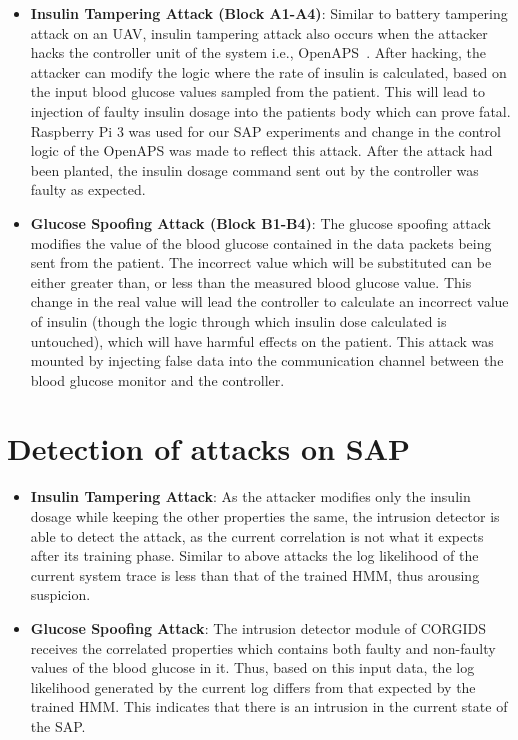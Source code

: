 \begin{itemize}
\item {\bf Insulin Tampering Attack (Block A1-A4)}: Similar to battery tampering attack on an \ac{UAV}, insulin tampering attack also occurs when the attacker hacks the controller unit of the system i.e., \ac{OpenAPS}~\cite{radcliffe2011hacking}. After hacking, the attacker can modify the logic where the rate of insulin is calculated, based on the input blood glucose values sampled from the patient. This will lead to injection of faulty insulin dosage into the patients body which can prove fatal. Raspberry Pi 3 was used for our \ac{SAP} experiments and change in the control logic of the \ac{OpenAPS} was made to reflect this attack. After the attack had been planted, the insulin dosage command sent out by the controller was faulty as expected.

\item {\bf Glucose Spoofing Attack (Block B1-B4)}: The glucose spoofing attack modifies the value of the blood glucose contained in the data packets being sent from the patient. The incorrect value which will be substituted can be either greater than, or less than the measured blood glucose value. This change in the real value will lead the controller to calculate an incorrect value of insulin (though the logic through which insulin dose calculated is untouched), which will have harmful effects on the patient. This attack was mounted by injecting false data into the communication channel between the blood glucose monitor and the controller.
\end{itemize}

\section{Detection of attacks on \ac{SAP}}
\begin{itemize}
\item {\bf Insulin Tampering Attack}: As the attacker modifies only the insulin dosage while keeping the other properties the same, the intrusion detector is able to detect the attack, as the current correlation is not what it expects after its training phase. Similar to above attacks the log likelihood of the current system trace is less than that of the trained \ac{HMM}, thus arousing suspicion.
\item {\bf Glucose Spoofing Attack}:  The intrusion detector module of \ac{CORGIDS} receives the correlated properties which contains both faulty and non-faulty values of the blood glucose in it. Thus, based on this input data, the log likelihood generated by the current log differs from that expected by the trained \ac{HMM}. This indicates that there is an intrusion in the current state of the \ac{SAP}.
\end{itemize}

